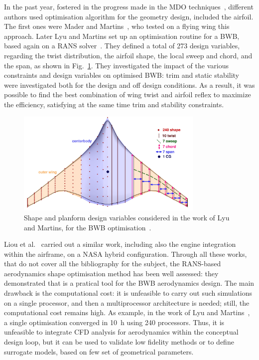 In the past year, fostered in the progress made in the MDO techniques~\cite{bib:martins_mdo}, different authors used optimisation algorithm for the geometry design, included the airfoil.
The first ones were Mader and Martins~\cite{bib:mader}, who tested on a flying wing this approach. 
Later Lyu and Martins set up an optimisation routine for a BWB, based again on a RANS solver~\cite{bib:lyu}. 
They defined a total of 273 design variables, regarding the twist distribution, the airfoil shape, the local sweep and chord, and the span, as shown in Fig.~\ref{fig:lyu_bwb_dv}. 
They investigated the impact of the various constraints and design variables on optimised BWB: trim and static stability were investigated both for the design and off design conditions. As a result, it was possible to find the best combination of wing twist and airfoil reflex to maximize the efficiency, satisfying at the same time trim and stability constraints.
\begin{figure}[h!]
	\centering
	\includegraphics[keepaspectratio, width=0.8\textwidth]{images/chap1/bwb_martins_design.jpg}
	\caption{Shape and planform design variables considered in the work of Lyu and Martins, for the BWB optimisation~\cite{bib:lyu}. }
	\label{fig:lyu_bwb_dv}
\end{figure}

Liou et al.~\cite{bib:liou_2016, bib:liou_2017} carried out a similar work, including also the engine integration within the airframe, on a NASA hybrid configuration. 
Through all these works, that do not cover all the bibliography for the subject, the RANS-based aerodynamics shape optimisation method has been well assessed: they demonstrated that is a pratical tool for the BWB aerodynamics design. 
The main drawback is the computational cost: it is unfeasible to carry out such simulations on a single processor, and then a multiprocessor architecture is needed; still, the computational cost remains high. 
As example, in the work of Lyu and Martins~\cite{bib:lyu}, a single optimisation converged in 10~\si{\hour} using 240 processors. 
Thus, it is unfeasible to integrate CFD analysis for aerodynamics within the conceptual design loop, but it can be used to validate low fidelity methods or to define surrogate models, based on few set of geometrical parameters. 

